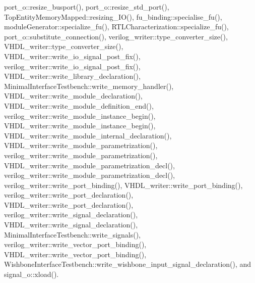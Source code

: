 port\+\_\+o\+::resize\+\_\+busport(), port\+\_\+o\+::resize\+\_\+std\+\_\+port(), Top\+Entity\+Memory\+Mapped\+::resizing\+\_\+\+I\+O(), fu\+\_\+binding\+::specialise\+\_\+fu(), module\+Generator\+::specialize\+\_\+fu(), R\+T\+L\+Characterization\+::specialize\+\_\+fu(), port\+\_\+o\+::substitute\+\_\+connection(), verilog\+\_\+writer\+::type\+\_\+converter\+\_\+size(), V\+H\+D\+L\+\_\+writer\+::type\+\_\+converter\+\_\+size(), V\+H\+D\+L\+\_\+writer\+::write\+\_\+io\+\_\+signal\+\_\+post\+\_\+fix(), verilog\+\_\+writer\+::write\+\_\+io\+\_\+signal\+\_\+post\+\_\+fix(), V\+H\+D\+L\+\_\+writer\+::write\+\_\+library\+\_\+declaration(), Minimal\+Interface\+Testbench\+::write\+\_\+memory\+\_\+handler(), V\+H\+D\+L\+\_\+writer\+::write\+\_\+module\+\_\+declaration(), V\+H\+D\+L\+\_\+writer\+::write\+\_\+module\+\_\+definition\+\_\+end(), verilog\+\_\+writer\+::write\+\_\+module\+\_\+instance\+\_\+begin(), V\+H\+D\+L\+\_\+writer\+::write\+\_\+module\+\_\+instance\+\_\+begin(), V\+H\+D\+L\+\_\+writer\+::write\+\_\+module\+\_\+internal\+\_\+declaration(), V\+H\+D\+L\+\_\+writer\+::write\+\_\+module\+\_\+parametrization(), verilog\+\_\+writer\+::write\+\_\+module\+\_\+parametrization(), V\+H\+D\+L\+\_\+writer\+::write\+\_\+module\+\_\+parametrization\+\_\+decl(), verilog\+\_\+writer\+::write\+\_\+module\+\_\+parametrization\+\_\+decl(), verilog\+\_\+writer\+::write\+\_\+port\+\_\+binding(), V\+H\+D\+L\+\_\+writer\+::write\+\_\+port\+\_\+binding(), verilog\+\_\+writer\+::write\+\_\+port\+\_\+declaration(), V\+H\+D\+L\+\_\+writer\+::write\+\_\+port\+\_\+declaration(), verilog\+\_\+writer\+::write\+\_\+signal\+\_\+declaration(), V\+H\+D\+L\+\_\+writer\+::write\+\_\+signal\+\_\+declaration(), Minimal\+Interface\+Testbench\+::write\+\_\+signals(), verilog\+\_\+writer\+::write\+\_\+vector\+\_\+port\+\_\+binding(), V\+H\+D\+L\+\_\+writer\+::write\+\_\+vector\+\_\+port\+\_\+binding(), Wishbone\+Interface\+Testbench\+::write\+\_\+wishbone\+\_\+input\+\_\+signal\+\_\+declaration(), and signal\+\_\+o\+::xload().

